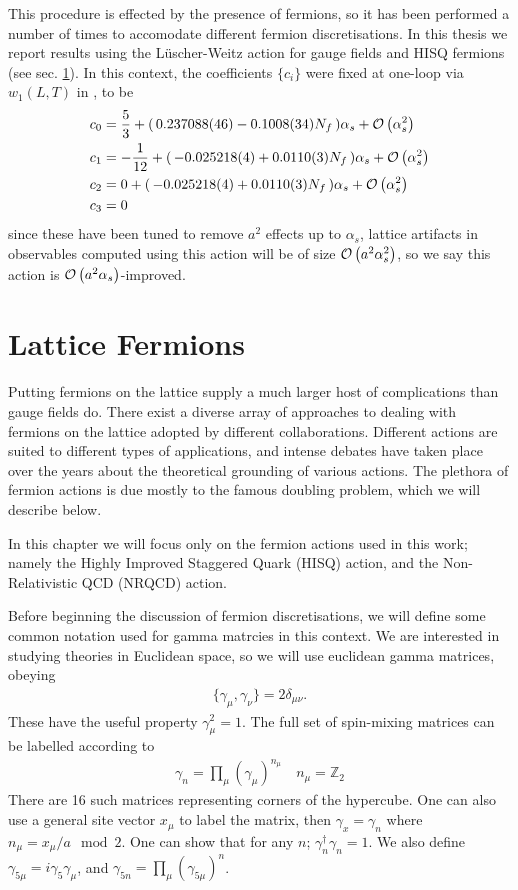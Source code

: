 This procedure is effected by the presence of fermions, so it has been performed a number of times to accomodate different fermion discretisations. In this thesis we report results using the L\"uscher-Weitz action for gauge fields and HISQ fermions (see sec. \ref{sec:fermions}). In this context, the coefficients $\{c_i\}$ were fixed at one-loop via $w_1(L,T)$ in \cite{Hart:2008sq}, to be
\begin{align}
  c_0& = {5\over 3} + ( \,0.237088(46) - 0.1008(34) N_f \,) \alpha_s + \mathcal{O}\left( \alpha_s^2 \right)\\
  c_1& = -{1\over 12} + ( \,-0.025218(4) + 0.0110(3) N_f \,) \alpha_s + \mathcal{O}\left( \alpha_s^2 \right)\\
  c_2& = 0 + ( \,-0.025218(4) + 0.0110(3) N_f \,) \alpha_s + \mathcal{O}\left( \alpha_s^2 \right) \\
  c_3& = 0
\end{align}
since these have been tuned to remove $a^2$ effects up to $\alpha_s$, lattice artifacts in observables computed using this action will be of size $\mathcal{O}\left( a^2\alpha_s^2 \right)$, so we say this action is $\mathcal{O}\left( a^2\alpha_s \right)$-improved.

\section{Lattice Fermions}
\label{sec:fermions}

Putting fermions on the lattice supply a much larger host of complications than gauge fields do. There exist a diverse array of approaches to dealing with fermions on the lattice adopted by different collaborations. Different actions are suited to different types of applications, and intense debates have taken place over the years about the theoretical grounding of various actions. The plethora of fermion actions is due mostly to the famous doubling problem, which we will describe below.

In this chapter we will focus only on the fermion actions used in this work; namely the Highly Improved Staggered Quark (HISQ) action, and the Non-Relativistic QCD (NRQCD) action.

Before beginning the discussion of fermion discretisations, we will define some common notation used for gamma matrcies in this context. We are interested in studying theories in Euclidean space, so we will use euclidean gamma matrices, obeying
\begin{align}
  \{\gamma_{\mu},\gamma_{\nu}\} = 2\delta_{\mu\nu}.
\end{align}
These have the useful property $\gamma_{\mu}^2=1$. The full set of spin-mixing matrices can be labelled according to
\begin{align}
  \gamma_n = \prod_{\mu} \left( \gamma_{\mu} \right)^{n_{\mu}} \quad n_{\mu} = \mathbb{Z}_2
\end{align}
There are 16 such matrices representing corners of the hypercube. One can also use a general site vector $x_{\mu}$ to label the matrix, then $\gamma_x = \gamma_n$ where $n_{\mu} = x_{\mu}/a \mod 2$. One can show that for any $n$; $\gamma_n^{\dagger} \gamma_n = 1$. We also define $\gamma_{5\mu} = i\gamma_5\gamma_{\mu}$, and $\gamma_{5n} = \prod_{\mu}(\gamma_{5\mu})^n$.

